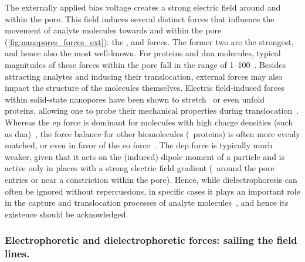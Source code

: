 The externally applied bias voltage creates a strong electric field around and within the pore. This field
induces several distinct forces that influence the movement of analyte molecules towards and within the pore
(\cref{fig:nanopores_forces_ext}): the , 
and  forces. The former two are the strongest, and hence also the most
well-known. For proteins and \gls{dna} molecules, typical magnitudes of these forces within the pore fall in
the range of \SIrange{1}{100}{\pN}~\cite{Keyser-2006,vanDorp-2009}. Besides attracting analytes and inducing
their translocation, external forces may also impact the structure of the molecules themselves. Electric
field-induced forces within solid-state nanopores have been shown to stretch~\cite{Freedman-2013} or even
unfold~\cite{Freedman-2011} proteins, allowing one to probe their mechanical properties during
translocation~\cite{Waduge-2017,Zhou-2020b}. Whereas the \gls{ep} force is dominant for molecules with high
charge densities (such as \gls{dna})~\cite{vanDorp-2009}, the force balance for other biomolecules
(\eg~proteins) is often more evenly matched, or even in favor of the \gls{eo}
force~\cite{Soskine-2013,Zhang-2020}. The \gls{dep} force is typically much weaker, given that it acts on the
(induced) dipole moment of a particle and is active only in places with a strong electric field gradient
(\ie~around the pore entries or near a constriction within the pore). Hence, while dielectrophoresis can often
be ignored without repercussions, in specific cases it plays an important role in the capture and
translocation processes of analyte molecules~\cite{Freedman-2016,Asandei-2016,Chinappi-2020}, and hence its
existence should be acknowledged.


\subsubsection{Electrophoretic and dielectrophoretic forces: sailing the field lines.}
%

